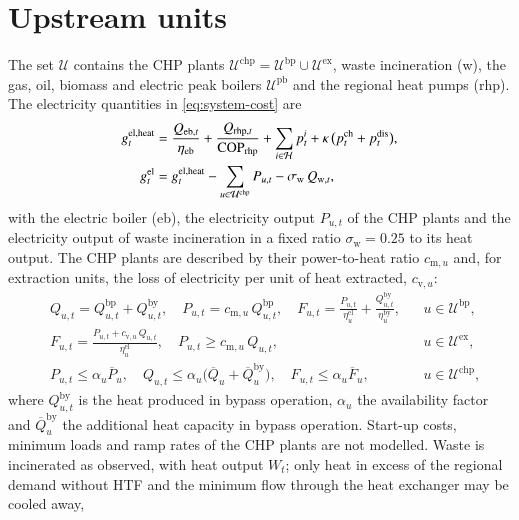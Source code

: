 \section{Upstream units}
\label{app:units}

The set $\mathcal U$ contains the CHP plants $\mathcal U^{\mathrm{chp}}=\mathcal U^{\mathrm{bp}}\cup\mathcal U^{\mathrm{ex}}$, waste incineration (w), the gas, oil, biomass and electric peak boilers $\mathcal U^{\mathrm{pb}}$ and the regional heat pumps (rhp). The electricity quantities in \cref{eq:system-cost} are
\begin{align}
g^{\mathrm{el,heat}}_t &= \frac{Q_{\mathrm{eb},t}}{\eta_{\mathrm{eb}}} + \frac{Q_{\mathrm{rhp},t}}{\mathrm{COP}_{\mathrm{rhp}}} + \sum_{i\in\mathcal{H}} p^i_t + \kappa\,\big(p^{\mathrm{ch}}_t+p^{\mathrm{dis}}_t\big), \label{eq:el-heat}\\
g^{\mathrm{el}}_t &= g^{\mathrm{el,heat}}_t - \sum_{u\in\mathcal U^{\mathrm{chp}}} P_{u,t} - \sigma_{\mathrm{w}}\,Q_{\mathrm{w},t}, \label{eq:el-balance}
\end{align}
with the electric boiler (eb), the electricity output $P_{u,t}$ of the CHP plants and the electricity output of waste incineration in a fixed ratio $\sigma_{\mathrm{w}}=0.25$ to its heat output. The CHP plants are described by their power-to-heat ratio $c_{\mathrm{m},u}$ and, for extraction units, the loss of electricity per unit of heat extracted, $c_{\mathrm{v},u}$:
\begin{align}
& Q_{u,t} = Q^{\mathrm{bp}}_{u,t} + Q^{\mathrm{by}}_{u,t}, \quad P_{u,t} = c_{\mathrm{m},u}\,Q^{\mathrm{bp}}_{u,t}, \quad F_{u,t} = \frac{P_{u,t}}{\eta^{\mathrm{el}}_u} + \frac{Q^{\mathrm{by}}_{u,t}}{\eta^{\mathrm{by}}_u}, && u\in\mathcal U^{\mathrm{bp}}, \label{eq:chp-bp}\\
& F_{u,t} = \frac{P_{u,t} + c_{\mathrm{v},u}\,Q_{u,t}}{\eta^{\mathrm{el}}_u}, \quad P_{u,t} \ge c_{\mathrm{m},u}\,Q_{u,t}, && u\in\mathcal U^{\mathrm{ex}}, \label{eq:chp-ex}\\
& P_{u,t}\le \alpha_u\overline P_u, \quad Q_{u,t}\le \alpha_u\big(\overline Q_u+\overline Q^{\mathrm{by}}_u\big), \quad F_{u,t}\le \alpha_u\overline F_u, && u\in\mathcal U^{\mathrm{chp}}, \label{eq:chp-limits}
\end{align}
where $Q^{\mathrm{by}}_{u,t}$ is the heat produced in bypass operation, $\alpha_u$ the availability factor and $\overline Q^{\mathrm{by}}_u$ the additional heat capacity in bypass operation. Start-up costs, minimum loads and ramp rates of the CHP plants are not modelled. Waste is incinerated as observed, with heat output $W_t$; only heat in excess of the regional demand without HTF and the minimum flow through the heat exchanger may be cooled away,
